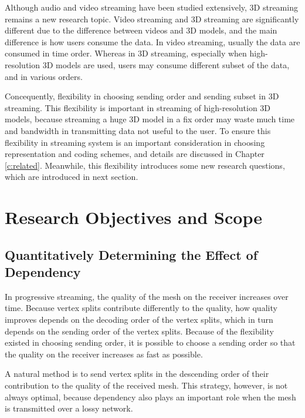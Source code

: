 \documentclass[11pt, a4paper]{report}
\begin{document}
    Although audio and video streaming have been studied extensively, 
    3D streaming remains a new research topic. 
    Video streaming and 3D streaming are significantly different
    due to the difference between videos and 3D models, and
    the main difference is how users consume the data.
    In video streaming, usually the data are consumed in time order. 
    Whereas in 3D streaming, especially when high-resolution 3D models are used,
    users may consume different subset of the data, and in various orders.
    
    Concequently, flexibility in choosing sending order and sending subset 
    in 3D streaming.
    This flexibility is important in streaming of high-resolution 3D models, 
    because streaming a huge 3D model in a fix order may waste much time and bandwidth in 
    transmitting data not useful to the user. 
    To ensure this flexibility in streaming system is an important consideration
    in choosing representation and coding schemes, and details are discussed
    in Chapter \ref{c:related}.
    Meanwhile, this flexibility introduces some new research questions, 
    which are introduced in next section. 

  \section{Research Objectives and Scope}
  \label{s:intro:objectives}
    \subsection{Quantitatively Determining the Effect of Dependency}
    In progressive streaming, the quality of the mesh on the receiver
    increases over time.
    Because vertex splits contribute differently to the quality, 
    how quality improves
    depends on the decoding order of the vertex splits,
    which in turn depends on the sending order of the vertex splits.
    Because of the flexibility existed in choosing sending order,
    it is possible to choose a sending order so that the 
    quality on the receiver increases as fast as possible.

    A natural method is to send vertex splits in the descending order
    of their contribution to the quality of the received mesh. 
    This strategy, however, is not always optimal, 
    because dependency also plays an important role
    when the mesh is transmitted over a lossy network.
    
\end{document}
